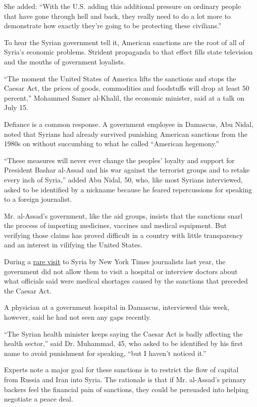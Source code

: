 She added: ``With the U.S. adding this additional pressure on ordinary
people that have gone through hell and back, they really need to do a
lot more to demonstrate how exactly they're going to be protecting these
civilians.''

To hear the Syrian government tell it, American sanctions are the root
of all of Syria's economic problems. Strident propaganda to that effect
fills state television and the mouths of government loyalists.

``The moment the United States of America lifts the sanctions and stops
the Caesar Act, the prices of goods, commodities and foodstuffs will
drop at least 50 percent,'' Mohammed Samer al-Khalil, the economic
minister, said at a talk on July 15.

Defiance is a common response. A government employee in Damascus, Abu
Nidal, noted that Syrians had already survived punishing American
sanctions from the 1980s on without succumbing to what he called
``American hegemony.''

``These measures will never ever change the peoples' loyalty and support
for President Bashar al-Assad and his war against the terrorist groups
and to retake every inch of Syria,'' added Abu Nidal, 50, who, like most
Syrians interviewed, asked to be identified by a nickname because he
feared repercussions for speaking to a foreign journalist.

Mr. al-Assad's government, like the aid groups, insists that the
sanctions snarl the process of importing medicines, vaccines and medical
equipment. But verifying those claims has proved difficult in a country
with little transparency and an interest in vilifying the United States.

During a
\href{https://www.nytimes.com/2019/08/20/world/middleeast/syria-recovery-aleppo-douma.html}{rare
visit} to Syria by New York Times journalists last year, the government
did not allow them to visit a hospital or interview doctors about what
officials said were medical shortages caused by the sanctions that
preceded the Caesar Act.

A physician at a government hospital in Damascus, interviewed this week,
however, said he had not seen any gaps recently.

``The Syrian health minister keeps saying the Caesar Act is badly
affecting the health sector,'' said Dr. Muhammad, 45, who asked to be
identified by his first name to avoid punishment for speaking, ``but I
haven't noticed it.''

Experts note a major goal for these sanctions is to restrict the flow of
capital from Russia and Iran into Syria. The rationale is that if Mr.
al-Assad's primary backers feel the financial pain of sanctions, they
could be persuaded into helping negotiate a peace deal.

